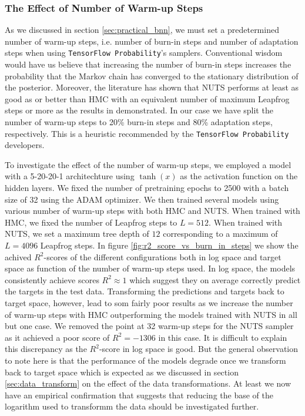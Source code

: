 \subsubsection{The Effect of Number of Warm-up Steps}
As we discussed in section \ref{sec:practical_bnn}, we must set a predetermined number of warm-up steps, i.e. number of burn-in steps and number of adaptation steps when using {\tt TensorFlow Probability}'s samplers.
Conventional wisdom would have us believe that increasing the number of burn-in steps increases the probability that the Markov chain has converged
to the stationary distribution of the posterior. Moreover, the literature has shown that NUTS performs at least as good as or better than HMC with an equivalent number of maximum Leapfrog steps or more as the results in \cite{nuts} demonstrated. In our case we have split the number of warm-up steps to 20\% burn-in steps and 80\% adaptation steps, respectively. This is a heuristic recommended by the {\tt TensorFlow Probability} developers.

To investigate the effect of the number of warm-up steps, we employed a model with a 5-20-20-1 architechture using $\tanh(x)$ as the activation function on the hidden layers. We fixed the number of pretraining epochs to 2500 with a batch size of 32 using the ADAM optimizer.
We then trained several models using various number of warm-up steps with both HMC and NUTS. When trained with HMC, we fixed the number of Leapfrog steps to $L = 512$. When trained with NUTS, we set a maximum tree depth of $12$ corresponding to a maximum of $L = 4096$ Leapfrog steps.
In figure \ref{fig:r2_score_vs_burn_in_steps} we show the achived $R^2$-scores of the different configurations both in log space and target space as function of the number of warm-up steps used. In log space, the models consistently achieve scores $R^2 \approx 1$ which suggest they on average correctly predict the targets in the test data. Transforming the predictions and targets back to target space, however, lead to som fairly poor results as we increase the number of warm-up steps with HMC outperforming the models trained with NUTS in all but one case. We removed the point at 32 warm-up steps for the NUTS sampler as it achieved a poor score of $R^2 = -1306$ in this case. It is difficult to explain this discrepancy as the $R^2$-score in log space is good. But the general observation to note here is that the performance of the models degrade once we transform back to target space which is expected as we discussed in section \ref{sec:data_transform} on the effect of the data transformations. At least we now have an empirical confirmation that suggests that reducing the base of the logarithm used to transformm the data should be investigated further.

